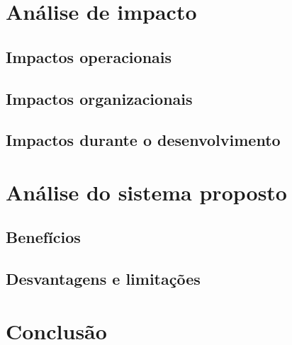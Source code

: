\documentclass[
	12pt,				%
	openright,			%
	twoside,			%
	a4paper,			%
	english,			%
	french,				%
	spanish,			%
	brazil,				%
	]{abntex2}
\begin{document}
\chapter{Análise de impacto}
\section{Impactos operacionais}
\section{Impactos organizacionais}
\section{Impactos durante o desenvolvimento}
\chapter{Análise do sistema proposto}
\section{Benefícios}
\section{Desvantagens e limitações}




\chapter{Conclusão}

\lipsum[31-33]

\postextual



%
%
\end{document}
